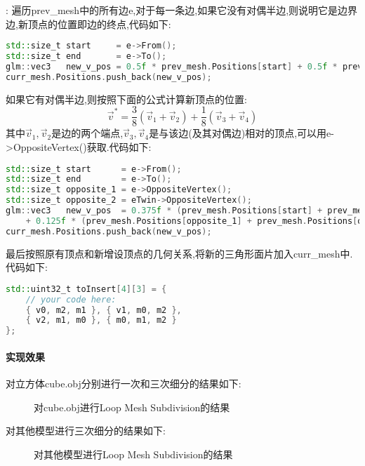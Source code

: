 \documentclass{ctexart}
\begin{document}
\indent {}:
遍历{\codefont prev\_mesh}中的所有边{\codefont e},对于每一条边,如果它没有对偶半边,则说明它是边界边,新顶点的位置即边的终点,代码如下:
\begin{lstlisting}[language=C++]
std::size_t start     = e->From();
std::size_t end       = e->To();
glm::vec3   new_v_pos = 0.5f * prev_mesh.Positions[start] + 0.5f * prev_mesh.Positions[end];
curr_mesh.Positions.push_back(new_v_pos);
\end{lstlisting}
如果它有对偶半边,则按照下面的公式计算新顶点的位置:
\[\vec{v}^\ast=\frac{3}{8}(\vec{v}_1+\vec{v}_2)+\frac{1}{8}(\vec{v}_3+\vec{v}_4)\]
其中$\vec{v}_1,\vec{v}_2$是边的两个端点,$\vec{v}_3,\vec{v}_4$是与该边(及其对偶边)相对的顶点,可以用{\codefont e->OppositeVertex()}获取.代码如下:
\begin{lstlisting}[language=C++]
std::size_t start      = e->From();
std::size_t end        = e->To();
std::size_t opposite_1 = e->OppositeVertex();
std::size_t opposite_2 = eTwin->OppositeVertex();
glm::vec3   new_v_pos  = 0.375f * (prev_mesh.Positions[start] + prev_mesh.Positions[end])
    + 0.125f * (prev_mesh.Positions[opposite_1] + prev_mesh.Positions[opposite_2]);
curr_mesh.Positions.push_back(new_v_pos);
\end{lstlisting}
最后按照原有顶点和新增设顶点的几何关系,将新的三角形面片加入{\codefont curr\_mesh}中.代码如下:
\begin{lstlisting}[language=C++]
std::uint32_t toInsert[4][3] = {
    // your code here:
    { v0, m2, m1 }, { v1, m0, m2 },
    { v2, m1, m0 }, { m0, m1, m2 }
};
\end{lstlisting}
\paragraph{实现效果}
对立方体{\codefont cube.obj}分别进行一次和三次细分的结果如下:
\begin{figure}[H]
    \centering
    \qquad\qquad
    \caption{对{\codefont cube.obj}进行Loop Mesh Subdivision的结果}
\end{figure}
对其他模型进行三次细分的结果如下:
\begin{figure}[H]
    \centering
    \qquad\qquad
    \qquad\qquad
    \qquad\qquad
    \caption{对其他模型进行Loop Mesh Subdivision的结果}
\end{figure}
\end{document}
